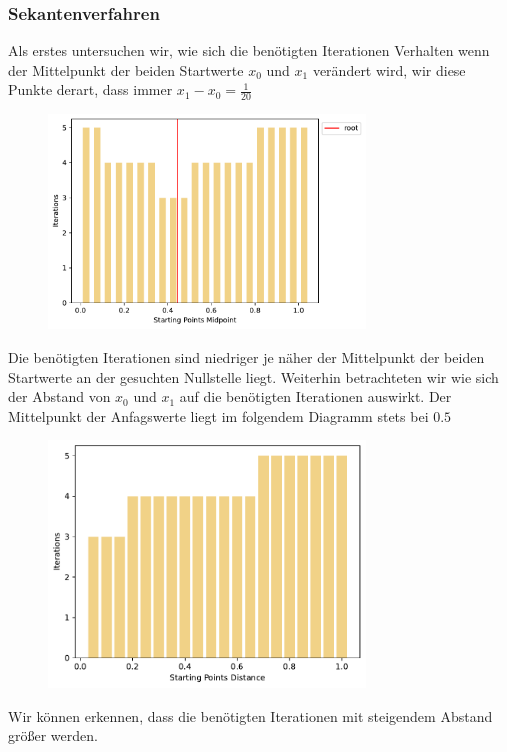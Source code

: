 \documentclass[a4paper,12pt]{article}
\newcommand{\1}{1\hspace{-0,9ex}1}
\begin{document}
\subsubsection*{Sekantenverfahren}
Als erstes untersuchen wir, wie sich die benötigten Iterationen Verhalten wenn der Mittelpunkt der beiden Startwerte $x_0$ und $x_1$ verändert wird, wir diese Punkte derart, dass immer $x_1-x_0=\frac{1}{20}$
\begin{figure}[!h]
	\centering
	\includegraphics[width=0.75\textwidth]{plots/secant_iterations_by_midpoint_of_starting_points.pdf}
\end{figure}
Die benötigten Iterationen sind niedriger je näher der Mittelpunkt der beiden Startwerte an der gesuchten Nullstelle liegt.
Weiterhin betrachteten wir wie sich der Abstand von $x_0$ und $x_1$ auf die benötigten Iterationen auswirkt. Der Mittelpunkt der Anfagswerte liegt im folgendem Diagramm stets bei $0.5$
\begin{figure}[!h]
	\centering
	\includegraphics[width=0.75\textwidth]{plots/secant_iterations_by_starting_points_distance.pdf}
\end{figure}
Wir können erkennen, dass die benötigten Iterationen mit steigendem Abstand größer werden.
\end{document}
